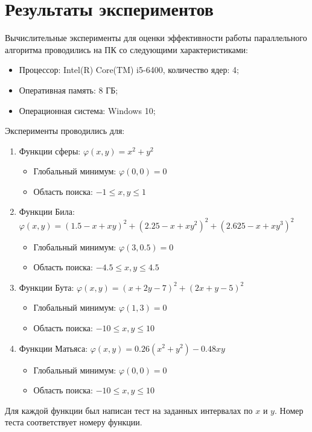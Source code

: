 \documentclass{report}
\begin{document}
\section*{Результаты экспериментов }
Вычислительные эксперименты для оценки эффективности работы параллельного алгоритма проводились на ПК со следующими характеристиками:
\begin{itemize}
	\item Процессор: Intel(R) Core(TM) i5-6400, количество ядер: 4;
	\item Оперативная память: 8 ГБ;
	\item Операционная система: Windows 10;
\end{itemize}
Эксперименты проводились для:
\begin{enumerate} 
	\item Функции сферы: $\varphi(x,y) = x^2 + y^2$
	\begin{itemize}
		\item Глобальный минимум: $\varphi(0,0) = 0$
		\item Область поиска: $-1 \leq x,y \leq 1$
	\end{itemize}
	\item Функции Била: $\varphi(x,y) = (1.5 - x + xy)^2 + (2.25 - x + xy^2)^2 + (2.625 - x + xy^3)^2$
	\begin{itemize}
		\item Глобальный минимум: $\varphi(3,0.5) = 0$
		\item Область поиска: $-4.5 \leq x,y \leq 4.5$
	\end{itemize}
	\item Функции Бута: $\varphi(x,y) = (x + 2y - 7)^2 + (2x + y - 5)^2$
	\begin{itemize}
		\item Глобальный минимум: $\varphi(1,3) = 0$
		\item Область поиска: $-10 \leq x,y \leq 10$
	\end{itemize}
	\item Функции Матьяса: $\varphi(x,y) = 0.26(x^2 + y^2) - 0.48xy$
	\begin{itemize}
		\item Глобальный минимум: $\varphi(0,0) = 0$
		\item Область поиска: $-10 \leq x,y \leq 10$
	\end{itemize}
\end{enumerate}
\newpage
\par Для каждой функции был написан тест на заданных интервалах по $x$ и $y$. Номер теста соответствует номеру функции.
\end{document}

